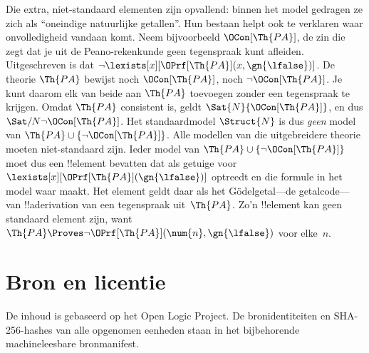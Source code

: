 \documentclass[openany]{memoir}
\begin{document}
Die extra, niet-standaard elementen zijn opvallend: binnen het model gedragen
ze zich als ``oneindige natuurlijke getallen''. Hun bestaan helpt ook te
verklaren waar onvolledigheid vandaan komt. Neem bijvoorbeeld
$\OCon[\Th{PA}]$, de zin die zegt dat je uit de Peano-rekenkunde geen
tegenspraak kunt afleiden. Uitgeschreven is dat $\lnot
\lexists[x][\OPrf[\Th{PA}](x, \gn{\lfalse})]$. De theorie $\Th{PA}$ bewijst
noch $\OCon[\Th{PA}]$, noch $\lnot \OCon[\Th{PA}]$. Je kunt daarom elk van
beide aan $\Th{PA}$ toevoegen zonder een tegenspraak te krijgen. Omdat
$\Th{PA}$ consistent is, geldt $\Sat{N}{\OCon[\Th{PA}]}$, en dus
$\Sat/{N}{\lnot \OCon[\Th{PA}]}$. Het standaardmodel $\Struct{N}$ is dus
\emph{geen} model van $\Th{PA} \cup \{\lnot \OCon[\Th{PA}]\}$. Alle
modellen van die uitgebreidere theorie moeten niet-standaard zijn. Ieder
model van $\Th{PA} \cup \{\lnot \OCon[\Th{PA}]\}$ moet dus een
!!{element} bevatten dat als getuige voor
$\lexists[x][\OPrf[\Th{PA}](\gn{\lfalse})]$ optreedt en die formule in het
model waar maakt. Het element geldt daar als het G\"odelgetal---de
getalcode---van !!a{derivation} van een tegenspraak uit~$\Th{PA}$. Zo'n
!!{element} kan geen standaard element zijn, want $\Th{PA} \Proves \lnot
\OPrf[\Th{PA}](\num{n}, \gn{\lfalse})$ voor elke~$n$.
\endgroup
\OLEndChapterHook
\OLEndPartHook

\clearpage
\chapter*{Bron en licentie}
De inhoud is gebaseerd op het Open Logic Project. De bronidentiteiten en
SHA-256-hashes van alle opgenomen eenheden staan in het bijbehorende
machineleesbare bronmanifest.


\end{document}
